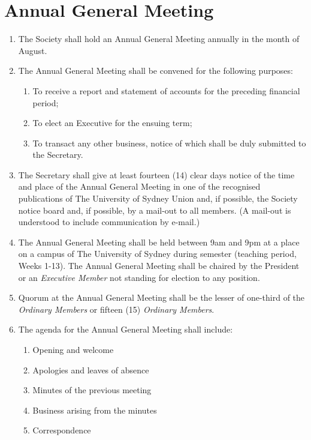 \documentclass[11pt]{article}
\begin{document}
\section{Annual General Meeting}
\begin{enumerate}[\thesection .1]
    \item The Society shall hold an Annual General Meeting annually in the month of August.
    \item The Annual General Meeting shall be convened for the following purposes:
    \begin{enumerate}[\hspace{5mm}1.]
        \item To receive a report and statement of accounts for the preceding financial period;
        \item To elect an Executive for the ensuing term;
        \item To transact any other business, notice of which shall be duly submitted to the Secretary.
    \end{enumerate}
    \item The Secretary shall give at least fourteen (14) clear days notice of the time and place of the Annual General Meeting in one of the recognised publications of The University of Sydney Union and, if possible, the Society notice board and, if possible, by a mail-out to all members. (A mail-out is understood to include communication by e-mail.)
    \item The Annual General Meeting shall be held between 9am and 9pm at a place on a campus of The University of Sydney during semester (teaching period, Weeks 1-13). The Annual General Meeting shall be chaired by the President or an \textit{Executive Member} not standing for election to any position.
    \item Quorum at the Annual General Meeting shall be the lesser of one-third of the \textit{Ordinary Members} or fifteen (15) \textit{Ordinary Members}.
    \item The agenda for the Annual General Meeting shall include:
    \begin{enumerate}[\hspace{5mm}1.]
        \item Opening and welcome
    	\item Apologies and leaves of absence
    	\item Minutes of the previous meeting
    	\item Business arising from the minutes
    	\item Correspondence

\end{enumerate}
\end{enumerate}
\end{document}
